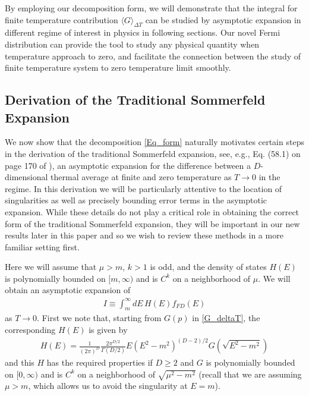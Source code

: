 \documentclass[sn-mathphys,Numbered]{sn-jnl}
\begin{document}
By employing our decomposition form, we will demonstrate that the integral for finite temperature contribution $\langle G\rangle_{\Delta T}$ can be studied by asymptotic expansion in different regime of interest in physics in following sections. Our novel Fermi distribution can provide the tool to study any physical quantity when temperature approach to zero, and facilitate the connection between the study of finite temperature system to zero temperature limit smoothly. 




\subsection{Derivation of the Traditional Sommerfeld Expansion}\label{sec:traditional_Sommerfeld}
We now show that the decomposition \eqref{Eq_form} naturally motivates certain steps in the derivation of the traditional Sommerfeld expansion, see, e.g., Eq. (58.1) on page 170 of \cite{landau2013statistical}), an  asymptotic expansion for the difference between a $D$-dimensional thermal average at finite and zero temperature as $T\to 0$ in the regime.  In this derivation we will be particularly attentive to the location of singularities as well as precisely bounding error terms in the asymptotic expansion.  While these details do not play a critical role in obtaining the correct form of the traditional Sommerfeld expansion, they will be important in our new results later in this paper and so we wish to review these methods in a more familiar setting first.


Here we will assume that $\mu>m$, $k>1$ is odd, and the density of states $H(E)$ is  polynomially bounded on $[m,\infty)$ and is $C^k$ on a neighborhood of $\mu$. We will obtain an asymptotic expansion of 
\begin{align}\label{eq:traditional_sommerfeld_I}
    I\equiv\int_m^\infty dE\, H(E) f_{FD}(E)
\end{align}
as $T\to 0$.  First we note that, starting from $G(p)$ in \eqref{G_deltaT}, the corresponding $H(E)$ is given by
\begin{align}
   H(E)= \frac{1}{(2\pi)^D}\frac{2\pi^{D/2}}{\Gamma(D/2)} E(E^2-m^2)^{(D-2)/2} G(\sqrt{E^2-m^2}) 
\end{align}
and this $H$ has the required properties if $D\geq 2$ and $G$ is polynomially bounded on $[0,\infty)$ and is $C^k$ on a neighborhood of $\sqrt{\mu^2-m^2}$ (recall that we are assuming $\mu>m$, which allows us to avoid the singularity at $E=m$).
\end{document}
